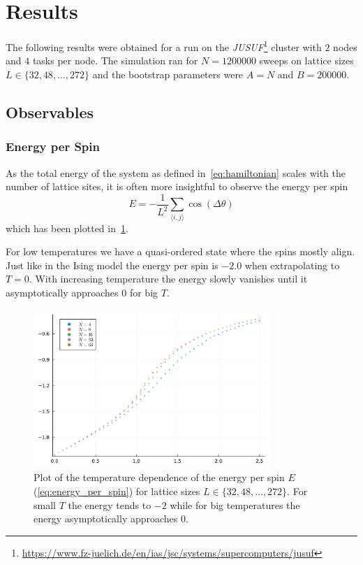 \section{Results}
The following results were obtained for a run on the \emph{JUSUF}\footnote{\url{https://www.fz-juelich.de/en/ias/jsc/systems/supercomputers/jusuf}} cluster with $2$ nodes and $4$ tasks per node. The simulation ran for $N = \num{1 200 000}$ sweeps on lattice sizes $L\in\{32, 48, \dots, 272\}$ and the bootstrap parameters were $A = N$ and $B = \num{200 000}$.

\subsection{Observables}\label{sec:observables}
\subsubsection{Energy per Spin}\label{sec:energy_per_spin}
As the total energy of the system as defined in~\cref{eq:hamiltonian} scales with the number of lattice sites, it is often more insightful to observe the energy per spin
\begin{equation}\label{eq:energy_per_spin}
	E = - \frac{1}{L^2} \sum_{\langle i,j \rangle}{\cos{(\Delta \theta)}}
\end{equation}
which has been plotted in~\cref{fig:energy_per_spin}.

For low temperatures we have a quasi-ordered state where the spins mostly align. Just like in the Ising model the energy per spin is $-2.0$ when extrapolating to $T=0$. With increasing temperature the energy slowly vanishes until it asymptotically approaches $0$ for big $T$.
\begin{figure}[ht]
	\centering
	\includegraphics[width=0.8\textwidth]{Energy.pdf}
	\caption[Temperature dependence of the energy per spin $E$]{Plot of the temperature dependence of the energy per spin $E$ (\cref{eq:energy_per_spin}) for lattice sizes $L\in\{32, 48, \dots, 272\}$. For small $T$ the energy tends to $\num{-2}$ while for big temperatures the energy asymptotically approaches $\num{0}$.}
	\label{fig:energy_per_spin}
\end{figure}


